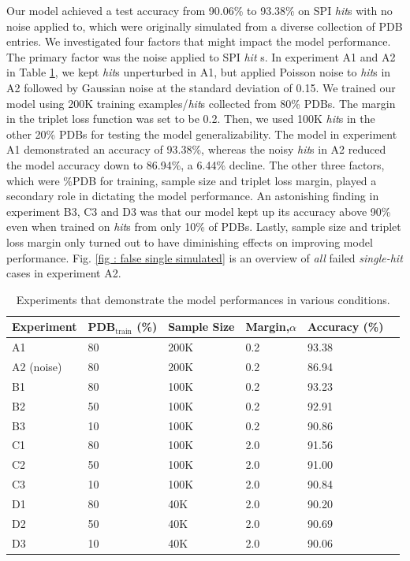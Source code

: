 Our model achieved a test accuracy from 90.06\% to 93.38\% on SPI \textit{hit}s
with no noise applied to, which were originally simulated from a diverse
collection of PDB entries.  We investigated four factors that might impact the
model performance.  The primary factor was the noise applied to SPI \textit{hit}
s.  In experiment A1 and A2 in Table \ref{tb : simulated performance}, we kept
\textit{hit}s unperturbed in A1, but applied Poisson noise to \textit{hit}s in
A2 followed by Gaussian noise at the standard deviation of 0.15.  We trained our
model using 200K training examples/\textit{hit}s collected from 80\% PDBs.  The
margin in the triplet loss function was set to be 0.2.  Then, we used 100K
\textit{hit}s in the other 20\% PDBs for testing the model generalizability.
The model in experiment A1 demonstrated an accuracy of 93.38\%, whereas the
noisy \textit{hit}s in A2 reduced the model accuracy down to 86.94\%, a 6.44\%
decline.  The other three factors, which were \%PDB for training, sample size
and triplet loss margin, played a secondary role in dictating the model
performance.  An astonishing finding in experiment B3, C3 and D3
was that our model kept up its accuracy above 90\% even when trained on
\textit{hit}s from only 10\% of PDBs.  Lastly, sample size and triplet loss
margin only turned out to have diminishing effects on improving model
performance.  Fig.  \ref{fig : false single simulated} is an overview of
\textit{all} failed \textit{single-hit} cases in experiment A2.


\begin{table}
    \caption{Experiments that demonstrate the model performances in various
    conditions.}
    \label{tb : simulated performance}
    \begin{tabularx}{\linewidth}{ l | X X X X X }
        Experiment  &
        PDB$_{\text{train}}$ (\%) &
        Sample Size &
        Margin,$\alpha$ &
        Accuracy (\%) \\
        \hline
        A1  & 80 & 200K &  0.2 & 93.38 \\
        A2 (noise)  & 80 & 200K &  0.2 & 86.94 \\
        \hline
        B1  & 80 & 100K &  0.2 & 93.23 \\
        B2  & 50 & 100K &  0.2 & 92.91 \\
        B3  & 10 & 100K &  0.2 & 90.86 \\
        \hline
        C1  & 80 & 100K &  2.0 & 91.56 \\
        C2  & 50 & 100K &  2.0 & 91.00 \\
        C3  & 10 & 100K &  2.0 & 90.84 \\
        \hline
        D1  & 80 & 40K  &  2.0 & 90.20 \\
        D2  & 50 & 40K  &  2.0 & 90.69 \\
        D3  & 10 & 40K  &  2.0 & 90.06 \\
    \end{tabularx}
\end{table}


